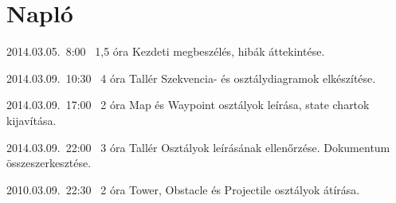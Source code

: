 %
\section{Napló}

\begin{naplo}


\bejegyzes
{2014.03.05.~8:00~} %
{1,5 óra} %
{\vadam\newline
\vantal\newline
\vbator\newline
\vtorok} %
{Kezdeti megbeszélés, hibák áttekintése.} %

\bejegyzes
{2014.03.09.~10:30~} %
{4 óra} %
{Tallér} %
{Szekvencia- és osztálydiagramok elkészítése.}

\bejegyzes
{2014.03.09.~17:00~}
{2 óra}
{\vadam}
{Map és Waypoint osztályok leírása, state chartok kijavítása.}

\bejegyzes
{2014.03.09.~22:00~} %
{3 óra} %
{Tallér} %
{Osztályok leírásának ellenőrzése. Dokumentum összeszerkesztése.}

\bejegyzes
{2010.03.09.~22:30~}
{2 óra}
{\vadam}
{Tower, Obstacle és Projectile osztályok átírása.}


\end{naplo}

